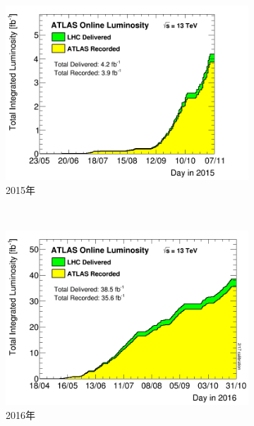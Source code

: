 \begin{figure}[!htbp]
    \centering
    \begin{subfigure}[b]{0.45\textwidth}
      \includegraphics[width=\textwidth]{fig/sumLumiByDay.png}
      \caption{2015年}
      \label{fig:data_taking_2015}
    \end{subfigure}%
    ~%
    \begin{subfigure}[b]{0.45\textwidth}
      \includegraphics[width=\textwidth]{fig/sumLumiByDay_2016.png}
      \caption{2016年}
      \label{fig:data_taking_2016}
    \end{subfigure} \\
    \begin{subfigure}[b]{0.45\textwidth}
      \centering

\end{subfigure}
\end{figure}
